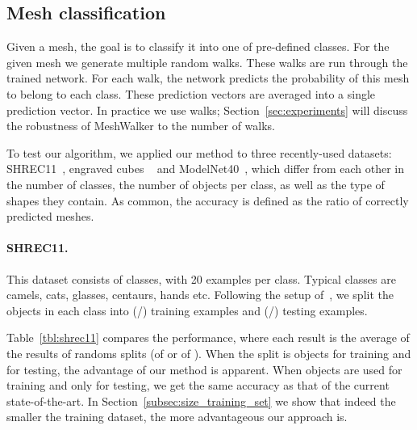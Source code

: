 \documentclass[acmtog]{acmart}
\begin{document}
\subsection{Mesh classification}
\label{subsec:classification}
Given a mesh, the goal is to classify it into one of pre-defined classes.
For the given mesh we generate multiple random walks.
These walks are run through the trained network. 
For each walk, the network predicts the probability of this mesh to belong to each class.
These prediction vectors are averaged into a single prediction vector.
In practice we use  walks; Section~\ref{sec:experiments} will discuss the robustness of MeshWalker to the number of walks. 

To test our algorithm, we applied our method to three recently-used datasets: SHREC11~\cite{lian2011shape}, engraved cubes ~\cite{hanocka2019meshcnn} and ModelNet40~\cite{wu20153d}, which differ from each other in the number of classes, the number of objects per class, as well as the type of shapes they contain.
As common, the accuracy is defined as the ratio of correctly predicted meshes.

\paragraph{SHREC11.}
This dataset consists of  classes, with 20 examples per class.
Typical classes are camels, cats, glasses, centaurs, hands etc.
Following the setup of~\cite{ezuz2017gwcnn}, we split the objects in each class into  (/)  training examples and   (/) testing examples.

Table~\ref{tbl:shrec11} compares the performance, where each result is the average of the results of  randoms splits (of  or of ). 
When the split is  objects for training and  for testing, the advantage of our method is apparent. 
When  objects are used for training and only  for testing, we get the same accuracy as that of the current state-of-the-art. 
In Section~\ref{subsec:size_training_set} we show that indeed the smaller the training dataset, the more advantageous our approach is.
\end{document}
